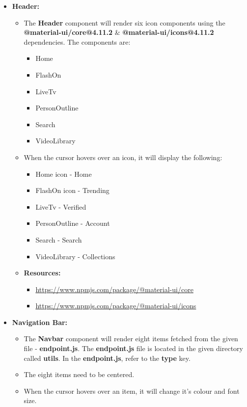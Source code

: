 \documentclass{article}
\begin{document}
\begin{itemize}
	\item \textbf{Header:}
	\begin{itemize}
		\item The \textbf{Header} component will render six icon components using the \textbf{@material-ui/core@4.11.2} \& \textbf{@material-ui/icons@4.11.2} dependencies. The components are:
		\begin{itemize}
			\item Home
			\item FlashOn
			\item LiveTv
			\item PersonOutline
			\item Search
			\item VideoLibrary
		\end{itemize} 
		\item When the cursor hovers over an icon, it will display the following:
		\begin{itemize}
			\item Home icon - Home
			\item FlashOn icon - Trending
			\item LiveTv - Verified
			\item PersonOutline - Account
			\item Search - Search
			\item VideoLibrary - Collections
		\end{itemize}
		\item \textbf{Resources:} 
		\begin{itemize}
			\item \href{https://www.npmjs.com/package/@material-ui/core}{https://www.npmjs.com/package/@material-ui/core}
			\item \href{https://www.npmjs.com/package/@material-ui/icons}{https://www.npmjs.com/package/@material-ui/icons}
		\end{itemize}
	\end{itemize}
	\item \textbf{Navigation Bar:}
	\begin{itemize}
		\item The \textbf{Navbar} component will render eight items fetched from the given file - \textbf{endpoint.js}. The \textbf{endpoint.js} file is located in the given directory called \textbf{utils}. In the \textbf{endpoint.js}, refer to the \textbf{type} key.
		\item The eight items need to be centered.
		\item When the cursor hovers over an item, it will change it's colour and font size.

\end{itemize}
\end{itemize}
\end{document}
